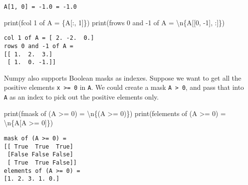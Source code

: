 \documentclass[
  letterpaper,
  DIV=11,
  numbers=noendperiod]{scrreprt}
\newenvironment{Shaded}{\begin{snugshade}}{\end{snugshade}}
\newcommand{\BuiltInTok}[1]{\textcolor[rgb]{0.00,0.23,0.31}{#1}}
\newcommand{\CharTok}[1]{\textcolor[rgb]{0.13,0.47,0.30}{#1}}
\newcommand{\DecValTok}[1]{\textcolor[rgb]{0.68,0.00,0.00}{#1}}
\newcommand{\NormalTok}[1]{\textcolor[rgb]{0.00,0.23,0.31}{#1}}
\newcommand{\OperatorTok}[1]{\textcolor[rgb]{0.37,0.37,0.37}{#1}}
\newcommand{\SpecialCharTok}[1]{\textcolor[rgb]{0.37,0.37,0.37}{#1}}
\newcommand{\SpecialStringTok}[1]{\textcolor[rgb]{0.13,0.47,0.30}{#1}}
\begin{document}
\begin{verbatim}
A[1, 0] = -1.0 = -1.0
\end{verbatim}

\begin{Shaded}
\begin{Highlighting}[]
\BuiltInTok{print}\NormalTok{(}\SpecialStringTok{f\textquotesingle{}col 1 of A = }\SpecialCharTok{\{}\NormalTok{A[:, }\DecValTok{1}\NormalTok{]}\SpecialCharTok{\}}\SpecialStringTok{\textquotesingle{}}\NormalTok{)}
\BuiltInTok{print}\NormalTok{(}\SpecialStringTok{f\textquotesingle{}rows 0 and {-}1 of A = }\CharTok{\textbackslash{}n}\SpecialCharTok{\{}\NormalTok{A[[}\DecValTok{0}\NormalTok{, }\OperatorTok{{-}}\DecValTok{1}\NormalTok{], :]}\SpecialCharTok{\}}\SpecialStringTok{\textquotesingle{}}\NormalTok{)}
\end{Highlighting}
\end{Shaded}

\begin{verbatim}
col 1 of A = [ 2. -2.  0.]
rows 0 and -1 of A = 
[[ 1.  2.  3.]
 [ 1.  0. -1.]]
\end{verbatim}

Numpy also supports Boolean masks as indexes. Suppose we want to get all
the positive elements \texttt{x\ \textgreater{}=\ 0} in \texttt{A}. We
could create a mask \texttt{A\ \textgreater{}\ 0}, and pass that into
\texttt{A} as an index to pick out the positive elements only.

\begin{Shaded}
\begin{Highlighting}[]
\BuiltInTok{print}\NormalTok{(}\SpecialStringTok{f\textquotesingle{}mask of (A \textgreater{}= 0) = }\CharTok{\textbackslash{}n}\SpecialCharTok{\{}\NormalTok{(A }\OperatorTok{\textgreater{}=} \DecValTok{0}\NormalTok{)}\SpecialCharTok{\}}\SpecialStringTok{\textquotesingle{}}\NormalTok{)}
\BuiltInTok{print}\NormalTok{(}\SpecialStringTok{f\textquotesingle{}elements of (A \textgreater{}= 0) = }\CharTok{\textbackslash{}n}\SpecialCharTok{\{}\NormalTok{A[A }\OperatorTok{\textgreater{}=} \DecValTok{0}\NormalTok{]}\SpecialCharTok{\}}\SpecialStringTok{\textquotesingle{}}\NormalTok{)}
\end{Highlighting}
\end{Shaded}

\begin{verbatim}
mask of (A >= 0) = 
[[ True  True  True]
 [False False False]
 [ True  True False]]
elements of (A >= 0) = 
[1. 2. 3. 1. 0.]
\end{verbatim}
\end{document}
